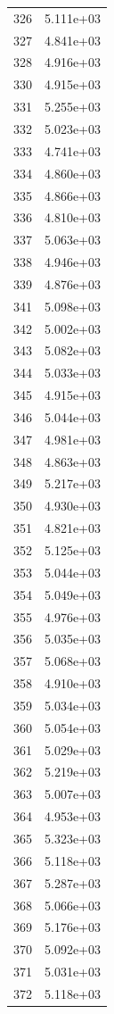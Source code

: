 \documentclass[12pt]{article}
\begin{document}
\begin{longtable}{@{}cc@{}}
326 & 5.111e+03 \\
327 & 4.841e+03 \\
328 & 4.916e+03 \\
330 & 4.915e+03 \\
331 & 5.255e+03 \\
332 & 5.023e+03 \\
333 & 4.741e+03 \\
334 & 4.860e+03 \\
335 & 4.866e+03 \\
336 & 4.810e+03 \\
337 & 5.063e+03 \\
338 & 4.946e+03 \\
339 & 4.876e+03 \\
341 & 5.098e+03 \\
342 & 5.002e+03 \\
343 & 5.082e+03 \\
344 & 5.033e+03 \\
345 & 4.915e+03 \\
346 & 5.044e+03 \\
347 & 4.981e+03 \\
348 & 4.863e+03 \\
349 & 5.217e+03 \\
350 & 4.930e+03 \\
351 & 4.821e+03 \\
352 & 5.125e+03 \\
353 & 5.044e+03 \\
354 & 5.049e+03 \\
355 & 4.976e+03 \\
356 & 5.035e+03 \\
357 & 5.068e+03 \\
358 & 4.910e+03 \\
359 & 5.034e+03 \\
360 & 5.054e+03 \\
361 & 5.029e+03 \\
362 & 5.219e+03 \\
363 & 5.007e+03 \\
364 & 4.953e+03 \\
365 & 5.323e+03 \\
366 & 5.118e+03 \\
367 & 5.287e+03 \\
368 & 5.066e+03 \\
369 & 5.176e+03 \\
370 & 5.092e+03 \\
371 & 5.031e+03 \\
372 & 5.118e+03 \\

\end{longtable}
\end{document}
